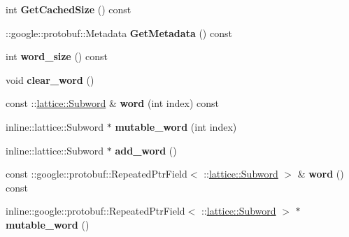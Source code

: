 \begin{DoxyCompactItemize}
\item 
\hypertarget{classlattice_1_1Phraselet_ae94d4b81c0ae8e195346f0b2836fa124}{
int {\bfseries GetCachedSize} () const }
\label{classlattice_1_1Phraselet_ae94d4b81c0ae8e195346f0b2836fa124}

\item 
\hypertarget{classlattice_1_1Phraselet_acbf23622238396acde2cf8b96dbf6df5}{
::google::protobuf::Metadata {\bfseries GetMetadata} () const }
\label{classlattice_1_1Phraselet_acbf23622238396acde2cf8b96dbf6df5}

\item 
\hypertarget{classlattice_1_1Phraselet_a5136efd90a23878ff47bb0290c5f9678}{
int {\bfseries word\_\-size} () const }
\label{classlattice_1_1Phraselet_a5136efd90a23878ff47bb0290c5f9678}

\item 
\hypertarget{classlattice_1_1Phraselet_a2ac956bf60b94eab43cb142bb2251731}{
void {\bfseries clear\_\-word} ()}
\label{classlattice_1_1Phraselet_a2ac956bf60b94eab43cb142bb2251731}

\item 
\hypertarget{classlattice_1_1Phraselet_a39c2b7f8be4d23aa423baf985107a0be}{
const ::\hyperlink{classlattice_1_1Subword}{lattice::Subword} \& {\bfseries word} (int index) const }
\label{classlattice_1_1Phraselet_a39c2b7f8be4d23aa423baf985107a0be}

\item 
\hypertarget{classlattice_1_1Phraselet_abe2be887d98594a7c3ce13844b8a87f3}{
inline::lattice::Subword $\ast$ {\bfseries mutable\_\-word} (int index)}
\label{classlattice_1_1Phraselet_abe2be887d98594a7c3ce13844b8a87f3}

\item 
\hypertarget{classlattice_1_1Phraselet_af499ae2b30d9739234523c9d790e07eb}{
inline::lattice::Subword $\ast$ {\bfseries add\_\-word} ()}
\label{classlattice_1_1Phraselet_af499ae2b30d9739234523c9d790e07eb}

\item 
\hypertarget{classlattice_1_1Phraselet_ad442b1e821ee49c64e44191d32200e60}{
const ::google::protobuf::RepeatedPtrField$<$ ::\hyperlink{classlattice_1_1Subword}{lattice::Subword} $>$ \& {\bfseries word} () const }
\label{classlattice_1_1Phraselet_ad442b1e821ee49c64e44191d32200e60}

\item 
\hypertarget{classlattice_1_1Phraselet_a4789a16818260e9df5f6cf5b954e70ee}{
inline::google::protobuf::RepeatedPtrField$<$ ::\hyperlink{classlattice_1_1Subword}{lattice::Subword} $>$ $\ast$ {\bfseries mutable\_\-word} ()}
\label{classlattice_1_1Phraselet_a4789a16818260e9df5f6cf5b954e70ee}


\end{DoxyCompactItemize}
